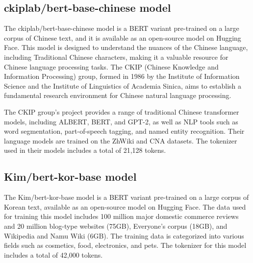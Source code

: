 \documentclass[PhD]{PHlab-thesis}
\begin{document}
\subsection{ckiplab/bert-base-chinese model}
The ckiplab/bert-base-chinese model is a BERT variant pre-trained on a large corpus of Chinese text, and it is available as an open-source model on Hugging Face.\cite{ckip-bert} This model is designed to understand the nuances of the Chinese language, including Traditional Chinese characters, making it a valuable resource for Chinese language processing tasks. The CKIP (Chinese Knowledge and Information Processing) group, formed in 1986 by the Institute of Information Science and the Institute of Linguistics of Academia Sinica, aims to establish a fundamental research environment for Chinese natural language processing.

The CKIP group's project provides a range of traditional Chinese transformer models, including ALBERT\cite{lan2019albert}, BERT, and GPT-2\cite{radford2019language}, as well as NLP tools such as word segmentation, part-of-speech tagging, and named entity recognition. Their language models are trained on the ZhWiki and CNA datasets\cite{10097977}. The tokenizer used in their models includes a total of 21,128 tokens.

\subsection{Kim/bert-kor-base model}
The Kim/bert-kor-base\cite{kim2020lmkor} model is a BERT variant pre-trained on a large corpus of Korean text, available as an open-source model on Hugging Face. The data used for training this model includes 100 million major domestic commerce reviews and 20 million blog-type websites (75GB), Everyone's corpus (18GB), and Wikipedia and Namu Wiki (6GB). The training data is categorized into various fields such as cosmetics, food, electronics, and pets. The tokenizer for this model includes a total of 42,000 tokens.


\end{document}
